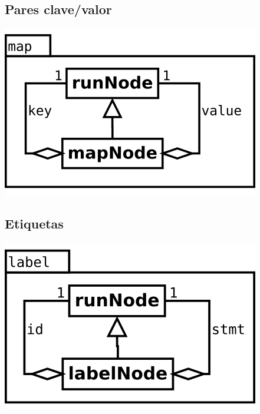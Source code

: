 \subsection {Pares clave/valor}
\begin{center}
\includegraphics[scale=0.4]{map.png} \\
\end{center}

\subsection {Etiquetas}
\begin{center}
\includegraphics[scale=0.4]{label.png} \\
\end{center}

